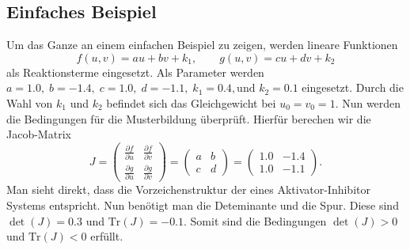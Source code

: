 \subsection{Einfaches Beispiel}
Um das Ganze an einem einfachen Beispiel zu zeigen, werden lineare Funktionen
\begin{equation}
f(u, v) = a u + b v + k_1, \qquad
g(u, v) = c u + d v + k_2
\label{reaktdiff:equ:ownreakterm}
\end{equation}
als Reaktionsterme eingesetzt.
Als Parameter werden \( a = 1.0,\; b = -1.4,\; c = 1.0,\; d = -1.1,\; k_1 = 0.4,\text{und }k_2 = 0.1 \) eingesetzt.
Durch die Wahl von \(k_1\) und \(k_2\) befindet sich das Gleichgewicht bei \(u_0 = v_0 = 1\).
Nun werden die Bedingungen für die Musterbildung überprüft.
Hierfür berechen wir die Jacob-Matrix
\begin{equation*}
        J =
        \begin{pmatrix}
        \frac{\partial f}{\partial u} & \frac{\partial f}{\partial v} \\
        \frac{\partial g}{\partial u} & \frac{\partial g}{\partial v}
        \end{pmatrix}
        =
        \begin{pmatrix}
        a & b \\
        c & d
        \end{pmatrix}
        =
        \begin{pmatrix}
        1.0 & -1.4 \\
        1.0 & -1.1
        \end{pmatrix}.
\end{equation*}
Man sieht direkt, dass die Vorzeichenstruktur der eines Aktivator-Inhibitor Systems entspricht.
Nun benötigt man die Deteminante und die Spur.
Diese sind \(\det(J) = 0.3\) und \(\text{Tr}(J) = -0.1\).
Somit sind die Bedingungen \(\det(J) > 0\) und \(\text{Tr}(J) <0\) erfüllt.

